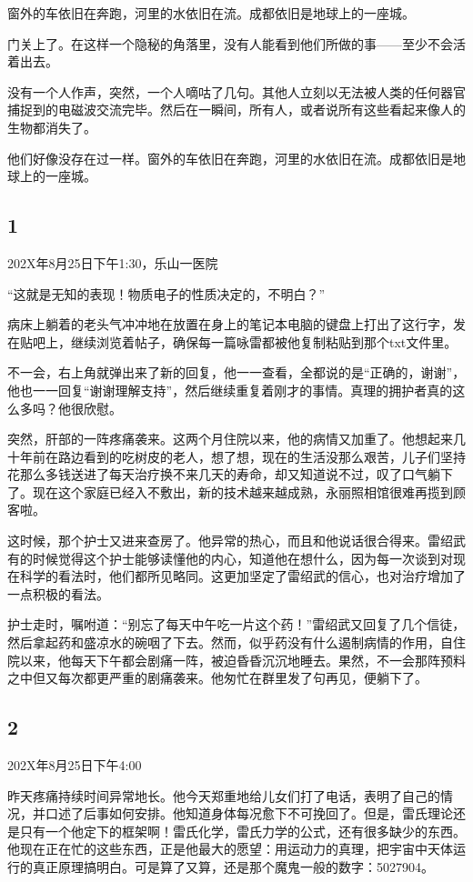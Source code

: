 \documentclass[UTF8,12pt,oneside]{ctexbook}
\begin{document}
窗外的车依旧在奔跑，河里的水依旧在流。成都依旧是地球上的一座城。

门关上了。在这样一个隐秘的角落里，没有人能看到他们所做的事——至少不会活着出去。

没有一个人作声，突然，一个人嘀咕了几句。其他人立刻以无法被人类的任何器官捕捉到的电磁波交流完毕。然后在一瞬间，所有人，或者说所有这些看起来像人的生物都消失了。

他们好像没存在过一样。窗外的车依旧在奔跑，河里的水依旧在流。成都依旧是地球上的一座城。

\subsection{1}
202X年8月25日下午1:30，乐山一医院

“这就是无知的表现！物质电子的性质决定的，不明白？”

病床上躺着的老头气冲冲地在放置在身上的笔记本电脑的键盘上打出了这行字，发在贴吧上，继续浏览着帖子，确保每一篇咏雷都被他复制粘贴到那个txt文件里。

不一会，右上角就弹出来了新的回复，他一一查看，全都说的是“正确的，谢谢”，他也一一回复“谢谢理解支持”，然后继续重复着刚才的事情。真理的拥护者真的这么多吗？他很欣慰。

突然，肝部的一阵疼痛袭来。这两个月住院以来，他的病情又加重了。他想起来几十年前在路边看到的吃树皮的老人，想了想，现在的生活没那么艰苦，儿子们坚持花那么多钱送进了每天治疗换不来几天的寿命，却又知道说不过，叹了口气躺下了。现在这个家庭已经入不敷出，新的技术越来越成熟，永丽照相馆很难再揽到顾客啦。

这时候，那个护士又进来查房了。他异常的热心，而且和他说话很合得来。雷绍武有的时候觉得这个护士能够读懂他的内心，知道他在想什么，因为每一次谈到对现在科学的看法时，他们都所见略同。这更加坚定了雷绍武的信心，也对治疗增加了一点积极的看法。

护士走时，嘱咐道：“别忘了每天中午吃一片这个药！”雷绍武又回复了几个信徒，然后拿起药和盛凉水的碗咽了下去。然而，似乎药没有什么遏制病情的作用，自住院以来，他每天下午都会剧痛一阵，被迫昏昏沉沉地睡去。果然，不一会那阵预料之中但又每次都更严重的剧痛袭来。他匆忙在群里发了句再见，便躺下了。

\subsection{2}
202X年8月25日下午4:00

昨天疼痛持续时间异常地长。他今天郑重地给儿女们打了电话，表明了自己的情况，并口述了后事如何安排。他知道身体每况愈下不可挽回了。但是，雷氏理论还是只有一个他定下的框架啊！雷氏化学，雷氏力学的公式，还有很多缺少的东西。他现在正在忙的这些东西，正是他最大的愿望：用运动力的真理，把宇宙中天体运行的真正原理搞明白。可是算了又算，还是那个魔鬼一般的数字：5027904。
\end{document}
